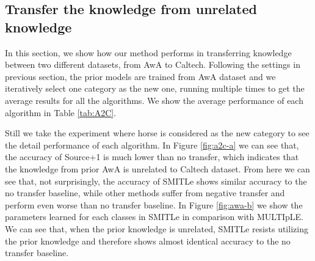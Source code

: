\subsection{Transfer the knowledge from unrelated knowledge}
In this section, we show how our method performs in transferring knowledge between two different datasets, from AwA to Caltech. Following the settings in previous section, the prior models are trained from AwA dataset and we iteratively select one category as the new one, running multiple times to get the average results for all the algorithms. We show the average performance of each algorithm in Table \ref{tab:A2C}. 

Still we take the experiment where horse is considered as the new category to see the detail performance of each algorithm. In Figure \ref{fig:a2c-a} we can see that, the accuracy of Source+1 is much lower than no transfer, which indicates that the knowledge from prior AwA is unrelated to Caltech dataset. From here we can see that, not surprisingly, the accuracy of SMITLe shows similar accuracy to the no transfer baseline, while other methods suffer from negative transfer and perform even worse than no transfer baseline.  In Figure \ref{fig:awa-b} we show the parameters learned for each classes in SMITLe in comparison with MULTIpLE. We can see that, when the prior knowledge is unrelated, SMITLe resists utilizing the prior knowledge and therefore shows almost identical accuracy to the no transfer baseline.

